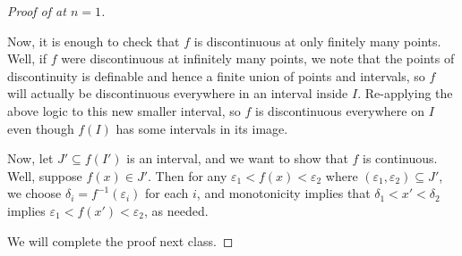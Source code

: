 \documentclass[../notes.tex]{subfiles}
\begin{document}
\begin{proof}[Proof of  at $n=1$]
\begin{enumerate}
		Now, it is enough to check that $f$ is discontinuous at only finitely many points. Well, if $f$ were discontinuous at infinitely many points, we note that the points of discontinuity is definable and hence a finite union of points and intervals, so $f$ will actually be discontinuous everywhere in an interval inside $I$. Re-applying the above logic to this new smaller interval, so $f$ is discontinuous everywhere on $I$ even though $f(I)$ has some intervals in its image.

		Now, let $J'\subseteq f(I')$ is an interval, and we want to show that $f$ is continuous. Well, suppose $f(x)\in J'$. Then for any $\varepsilon_1<f(x)<\varepsilon_2$ where $(\varepsilon_1,\varepsilon_2)\subseteq J'$, we choose $\delta_i=f^{-1}(\varepsilon_i)$ for each $i$, and monotonicity implies that $\delta_1<x'<\delta_2$ implies $\varepsilon_1<f(x')<\varepsilon_2$, as needed.
	\end{enumerate}
	We will complete the proof next class.
\end{proof}
\end{document}
